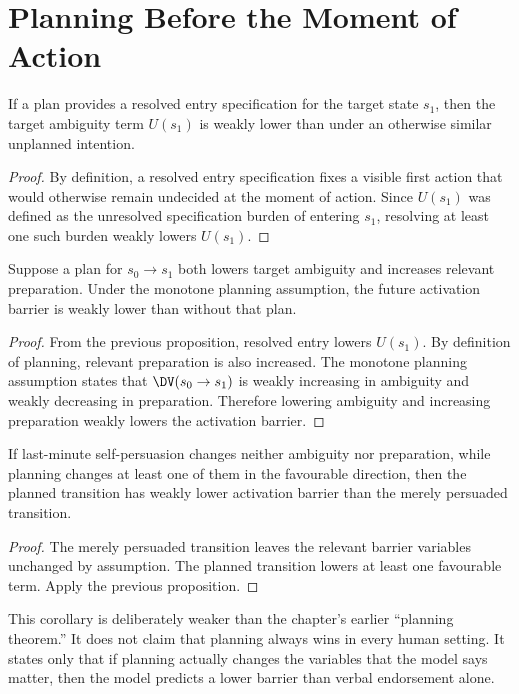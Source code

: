 \section{Planning Before the Moment of Action}

\begin{proposition}
If a plan provides a resolved entry specification for the target state $s_1$,
then the target ambiguity term $U(s_1)$ is weakly lower than under an otherwise
similar unplanned intention.
\end{proposition}

\begin{proof}
By definition, a resolved entry specification fixes a visible first action that
would otherwise remain undecided at the moment of action. Since $U(s_1)$ was
defined as the unresolved specification burden of entering $s_1$, resolving at
least one such burden weakly lowers $U(s_1)$.
\end{proof}

\begin{proposition}
Suppose a plan for $s_0 \to s_1$ both lowers target ambiguity and increases
relevant preparation. Under the monotone planning assumption, the future
activation barrier is weakly lower than without that plan.
\end{proposition}

\begin{proof}
From the previous proposition, resolved entry lowers $U(s_1)$. By definition
of planning, relevant preparation is also increased. The monotone planning
assumption states that $\DV(s_0 \to s_1)$ is weakly increasing in ambiguity and
weakly decreasing in preparation. Therefore lowering ambiguity and increasing
preparation weakly lowers the activation barrier.
\end{proof}

\begin{corollary}
If last-minute self-persuasion changes neither ambiguity nor preparation, while
planning changes at least one of them in the favourable direction, then the
planned transition has weakly lower activation barrier than the merely
persuaded transition.
\end{corollary}

\begin{proof}
The merely persuaded transition leaves the relevant barrier variables unchanged
by assumption. The planned transition lowers at least one favourable term.
Apply the previous proposition.
\end{proof}

\begin{remark}
This corollary is deliberately weaker than the chapter's earlier ``planning
theorem.'' It does not claim that planning always wins in every human setting.
It states only that if planning actually changes the variables that the model
says matter, then the model predicts a lower barrier than verbal endorsement
alone.
\end{remark}

